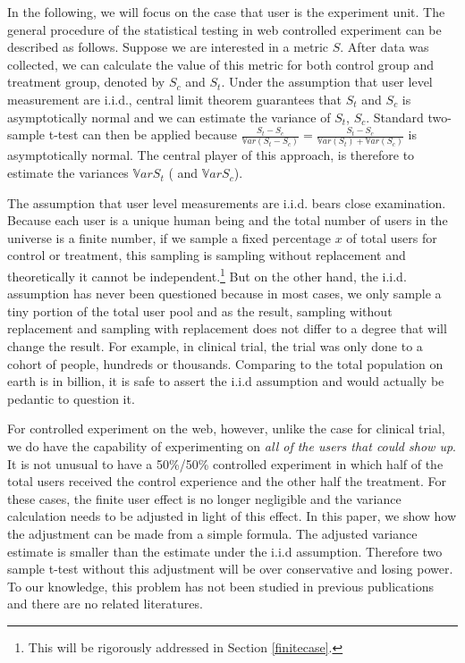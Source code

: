 \documentclass[10pt]{article}
\newcommand{\var}{\ensuremath{\mathbb Var}}
\begin{document}
In the following, we will focus on the case that user is the experiment unit.  The general procedure of the statistical testing in web controlled experiment can be described as follows. Suppose we are interested in a metric $S$. After data was collected, we can calculate the value of this metric for both control group and treatment group, denoted by $S_c$ and $S_t$. Under the assumption that user level measurement are i.i.d., central limit theorem guarantees that $S_t$ and $S_c$ is asymptotically normal and we can estimate the variance of $S_t$, $S_c$. Standard two-sample t-test can then be applied because $\frac{S_t-S_c}{\var(S_t-S_c)} =\frac{S_t-S_c}{\var (S_t)+\var (S_c)}$ is asymptotically normal. The central player of this approach, is therefore to estimate the variances $\var S_t$ ( and $\var S_c$). 

The assumption that user level measurements are i.i.d. bears close examination. Because each user is a unique human being and the total number of users in the universe is a finite number, if we sample a fixed percentage $x$ of total users for control or treatment, this sampling is sampling without replacement and theoretically it cannot be independent.\footnote{This will be rigorously addressed in Section \ref{finitecase}.} But on the other hand, the i.i.d. assumption has never been questioned because in most cases, we only sample a tiny portion of the total user pool and as the result, sampling without replacement and sampling with replacement does not differ to a degree that will change the result. For example, in clinical trial, the trial was only done to  a cohort of people, hundreds or thousands. Comparing to the total population on earth is in billion, it is safe to assert the i.i.d assumption and would actually be pedantic to question it. 

For controlled experiment on the web, however, unlike the case for clinical trial, we do have the capability of experimenting on \emph{all of the users that could show up}. It is not unusual to have a 50\%/50\% controlled experiment in which half of the total users received the control experience and the other half the treatment. For these cases, the finite user effect is no longer negligible and the variance calculation needs to be adjusted in light of this effect. In this paper, we show how the adjustment can be made from a simple formula. The adjusted variance estimate is smaller than the estimate under the i.i.d assumption. Therefore two sample t-test without this adjustment will be over conservative and losing power. To our knowledge, this problem has not been studied in previous publications and there are no related literatures. 
\end{document}
